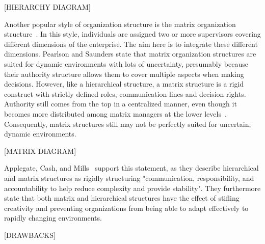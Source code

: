 [HIERARCHY DIAGRAM]

Another popular style of organization structure is the matrix organization structure~\cite{pearlson2009}. In this style, individuals are assigned two or more supervisors covering different dimensions of the enterprise. The aim here is to integrate these different dimensions. Pearlson and Saunders state that matrix organization structures are suited for dynamic environments with lots of uncertainty, presumably because their authority structure allows them to cover multiple aspects when making decisions. However, like a hierarchical structure, a matrix structure is a rigid construct with strictly defined roles, communication lines and decision rights. Authority still comes from the top in a centralized manner, even though it becomes more distributed among matrix managers at the lower levels~\cite{pearlson2009}. Consequently, matrix structures still may not be perfectly suited for uncertain, dynamic environments. 

[MATRIX DIAGRAM]

Applegate, Cash, and Mills~\cite{applegate1988} support this statement, as they describe hierarchical and matrix structures as rigidly structuring "communication, responsibility, and accountability to help reduce complexity and provide  stability". They furthermore state that both matrix and hierarchical structures have the effect of stifling creativity and preventing organizations from being able to adapt effectively to rapidly changing environments. 

[DRAWBACKS]

